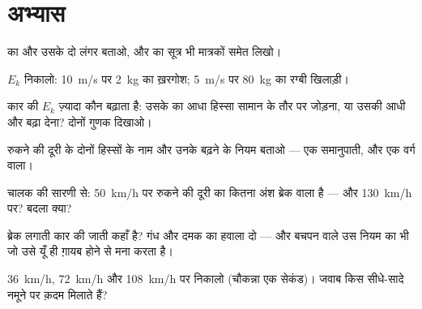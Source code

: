 \section{अभ्यास}

\begin{exercise}[$\star$]\label{exo:g9:kinetic-energy-safety:1}
 का  और उसके दो लंगर बताओ, और  का सूत्र भी
मात्रकों समेत लिखो।
\end{exercise}

\begin{exercise}[$\star$]\label{exo:g9:kinetic-energy-safety:2}
$E_k$ निकालो: \qty{10}{m/s} पर \qty{2}{kg} का ख़रगोश; \qty{5}{m/s} पर
\qty{80}{kg} का रग्बी खिलाड़ी।
\end{exercise}

\begin{exercise}[$\star$]\label{exo:g9:kinetic-energy-safety:3}
कार की $E_k$ ज़्यादा कौन बढ़ाता है: उसके  का आधा हिस्सा सामान
के तौर पर जोड़ना, या उसकी  आधी और बढ़ा देना? दोनों गुणक दिखाओ।
\end{exercise}

\begin{exercise}[$\star$]\label{exo:g9:kinetic-energy-safety:4}
रुकने की दूरी के दोनों हिस्सों के नाम और उनके बढ़ने के नियम बताओ ---
एक समानुपाती, और एक वर्ग वाला।
\end{exercise}

\begin{exercise}[$\star$]\label{exo:g9:kinetic-energy-safety:5}
चालक की सारणी से: \qty{50}{km/h} पर रुकने की दूरी का कितना अंश ब्रेक
वाला है --- और \qty{130}{km/h} पर? बदला क्या?
\end{exercise}

\begin{exercise}[$\star$]\label{exo:g9:kinetic-energy-safety:6}
ब्रेक लगाती कार की  जाती कहाँ है? गंध और दमक का हवाला दो ---
और बचपन वाले उस नियम का भी जो उसे यूँ ही ग़ायब होने से मना करता है।
\end{exercise}

\begin{exercise}[$\star$]\label{exo:g9:kinetic-energy-safety:7}
\qty{36}{km/h}, \qty{72}{km/h} और \qty{108}{km/h} पर 
निकालो (चौकन्ना एक सेकंड)। जवाब किस सीधे-सादे नमूने पर क़दम मिलाते
हैं?
\end{exercise}

